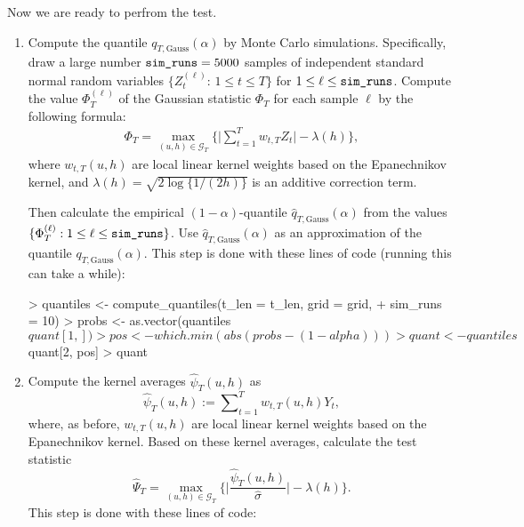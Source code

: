\documentclass[a4paper]{scrartcl}
\begin{document}
Now we are ready to perfrom the test.
\begin{enumerate}[label=\textit{Step \arabic*.}, leftmargin=1.45cm]
  \item Compute the quantile $q_{T,\text{Gauss}}(\alpha)$ by Monte Carlo simulations. Specifically, draw a large number $\verb|sim_runs| = 5000$ samples of independent standard normal random variables $\{Z_{t}^{(\ell)} : \, 1 \le t \le T \}$ for $1 \le \ell \le \verb|sim_runs|$. Compute the value $\Phi_T^{(\ell)}$ of the Gaussian statistic $\Phi_T$ for each sample $\ell$ by the following formula:
\begin{align*}
\Phi_T = \max_{(u, h) \in \mathcal{G}_T}\bigg\{ \Big|\sum\limits_{t=1}^T w_{t, T} Z_{t}\Big| - \lambda(h) \bigg\},
\end{align*}
where $w_{t, T}(u, h)$ are local linear kernel weights based on the Epanechnikov kernel, and $\lambda(h) = \sqrt{2 \log \{ 1/(2h) \}}$ is an additive correction term.

Then calculate the empirical $(1-\alpha)$-quantile $\widehat{q}_{T,\text{Gauss}}(\alpha)$ from the values $\{ \Phi_T^{(\ell)}: 1 \le \ell \le \verb|sim_runs| \}$. Use $\widehat{q}_{T,\text{Gauss}}(\alpha)$ as an approximation of the quantile $q_{T,\text{Gauss}}(\alpha)$.
This step is done with these lines of code (running this can take a while):

\begin{Schunk}
\begin{Sinput}
> quantiles <- compute_quantiles(t_len = t_len, grid = grid,
+                                sim_runs = 10)
> probs <- as.vector(quantiles$quant[1, ])
> pos   <- which.min(abs(probs - (1 - alpha)))
> quant <- quantiles$quant[2, pos]
> quant
\end{Sinput}
\end{Schunk}
  \item Compute the kernel averages $\widehat{\psi}_{T}(u, h)$ as
  \begin{equation*}
 \widehat{\psi}_{T}(u, h) := \sum\nolimits_{t=1}^T w_{t, T}(u, h) Y_{t},
\end{equation*}
where, as before, $w_{t, T}(u, h)$ are local linear kernel weights based on the Epanechnikov kernel. Based on these kernel averages, calculate the test statistic
$$\hat{\Psi}_{T} = \max_{(u, h)\in \mathcal{G}_T} \bigg\{ \Big| \frac{\hat{\psi}_{T}(u, h) }{\widehat{\sigma}}\Big| - \lambda(h) \Bigg\}.$$
This step is done with these lines of code:


\end{enumerate}
\end{document}
